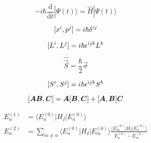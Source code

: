 \begin{equation*}
    -i \hbar \frac{\mathrm{d}}{\mathrm{d}t} |\Psi(t)\rangle = \hat{H} |\Psi(t) \rangle
\end{equation*}

\begin{equation*}
    [x^{i},p^{j}] = i \hbar \delta^{ij}
\end{equation*}

\begin{equation*}
    [L^{i},L^{j}] = i\hbar \epsilon^{ijk}L^{k}
\end{equation*}

\begin{equation*}
    \hat{\vec{S}} = \frac{\hbar}{2} \vec{\sigma}
\end{equation*}

\begin{equation*}
    [S^{i},S^{j}] = i\hbar \epsilon^{ijk}S^{k}
\end{equation*}

\begin{equation*}
    [\boldsymbol{A} \boldsymbol{B},\boldsymbol{C}] = \boldsymbol{A}[\boldsymbol{B},\boldsymbol{C}] + [\boldsymbol{A},\boldsymbol{B}]\boldsymbol{C}
\end{equation*}

\begin{align*}
    E_{n}^{(1)} &= \langle E_{n}^{(0)} | H_{I} | E_{n}^{(0)} \rangle \\
    E_{n}^{(2)} &= \sum_{m \neq n} \langle E_{n}^{(0)} | H_{I} | E_{m}^{(0)} \rangle \frac{\langle E_{m}^{(0)} | H_{I} | E_{n}^{(0)} \rangle}{E_{n}^{(0)} - E_{m}^{(0)}} \\
\end{align*}
